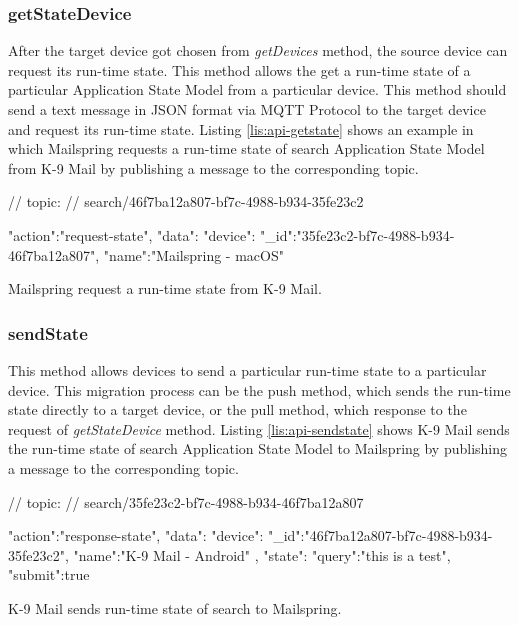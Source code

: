 \subsubsection{getStateDevice}
After the target device got chosen from \textit{getDevices} method, the source device can request its run-time state. This method allows the get a run-time state of a particular Application State Model from a particular device. This method should send a text message in JSON format via MQTT Protocol to the target device and request its run-time state. Listing \ref{lis:api-getstate} shows an example in which Mailspring requests a run-time state of search Application State Model from K-9 Mail by publishing a message to the corresponding topic.

\FloatBarrier
\begin{code}
\begin{js2}
// topic:
// search/46f7ba12a807-bf7c-4988-b934-35fe23c2
\end{js2}

\begin{json}
{
   "action":"request-state",
   "data":{
      "device":{
         "_id":"35fe23c2-bf7c-4988-b934-46f7ba12a807",
         "name":"Mailspring - macOS"
      }
   }
}
\end{json}
\caption{Mailspring request a run-time state from K-9 Mail.}
\label{lis:api-getstate}
\end{code}
\FloatBarrier

\subsubsection{sendState}
This method allows devices to send a particular run-time state to a particular device. This migration process can be the push method, which sends the run-time state directly to a target device, or the pull method, which response to the request of \textit{getStateDevice} method. Listing \ref{lis:api-sendstate} shows K-9 Mail sends the run-time state of search Application State Model to Mailspring by publishing a message to the corresponding topic.


\FloatBarrier
\begin{code}
\begin{js2}
// topic:
// search/35fe23c2-bf7c-4988-b934-46f7ba12a807
\end{js2}

\begin{json}
{
   "action":"response-state",
   "data":{
      "device":{
         "_id":"46f7ba12a807-bf7c-4988-b934-35fe23c2",
         "name":"K-9 Mail - Android"
      },
      "state":{
         "query":"this is a test",
         "submit":true
      }
   }
}
\end{json}
\caption{K-9 Mail sends run-time state of search to Mailspring.}
\label{lis:api-sendstate}
\end{code}
\FloatBarrier

